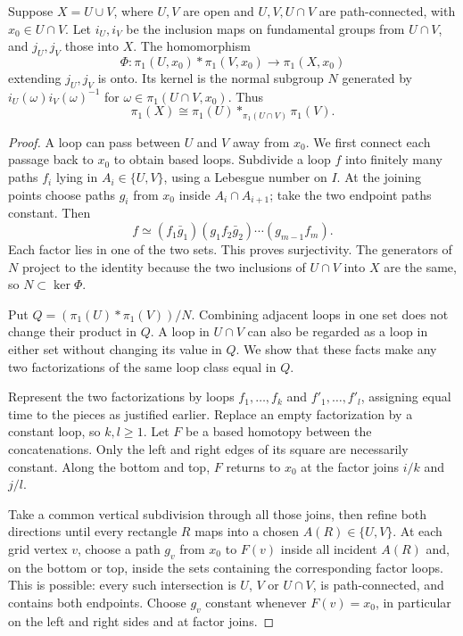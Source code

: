 \begin{theorem}\label{thm:vankampen}
Suppose $X=U\cup V$, where $U,V$ are open and $U,V,U\cap V$ are path-connected, with $x_0\in U\cap V$. Let $i_U,i_V$ be the inclusion maps on fundamental groups from $U\cap V$, and $j_U,j_V$ those into $X$. The homomorphism
\[
\Phi:\pi_1(U,x_0)\ast\pi_1(V,x_0)\longrightarrow\pi_1(X,x_0)
\]
extending $j_U,j_V$ is onto. Its kernel is the normal subgroup $N$ generated by $i_U(\omega)i_V(\omega)^{-1}$ for $\omega\in\pi_1(U\cap V,x_0)$. Thus
\[
\pi_1(X)\cong\pi_1(U)\ast_{\pi_1(U\cap V)}\pi_1(V).
\]
\end{theorem}

\begin{proof}
A loop can pass between $U$ and $V$ away from $x_0$. We first connect each passage back to $x_0$ to obtain based loops. Subdivide a loop $f$ into finitely many paths $f_i$ lying in $A_i\in\{U,V\}$, using a Lebesgue number on $I$. At the joining points choose paths $g_i$ from $x_0$ inside $A_i\cap A_{i+1}$; take the two endpoint paths constant. Then
\[
f\simeq(f_1\bar g_1)(g_1f_2\bar g_2)\cdots(g_{m-1}f_m).
\]
Each factor lies in one of the two sets. This proves surjectivity. The generators of $N$ project to the identity because the two inclusions of $U\cap V$ into $X$ are the same, so $N\subset\ker\Phi$.

Put $Q=(\pi_1(U)\ast\pi_1(V))/N$. Combining adjacent loops in one set does not change their product in $Q$. A loop in $U\cap V$ can also be regarded as a loop in either set without changing its value in $Q$. We show that these facts make any two factorizations of the same loop class equal in $Q$.

Represent the two factorizations by loops $f_1,\ldots,f_k$ and $f'_1,\ldots,f'_l$, assigning equal time to the pieces as justified earlier. Replace an empty factorization by a constant loop, so $k,l\ge1$. Let $F$ be a based homotopy between the concatenations. Only the left and right edges of its square are necessarily constant. Along the bottom and top, $F$ returns to $x_0$ at the factor joins $i/k$ and $j/l$.

Take a common vertical subdivision through all those joins, then refine both directions until every rectangle $R$ maps into a chosen $A(R)\in\{U,V\}$. At each grid vertex $v$, choose a path $g_v$ from $x_0$ to $F(v)$ inside all incident $A(R)$ and, on the bottom or top, inside the sets containing the corresponding factor loops. This is possible: every such intersection is $U$, $V$ or $U\cap V$, is path-connected, and contains both endpoints. Choose $g_v$ constant whenever $F(v)=x_0$, in particular on the left and right sides and at factor joins.


\end{proof}

